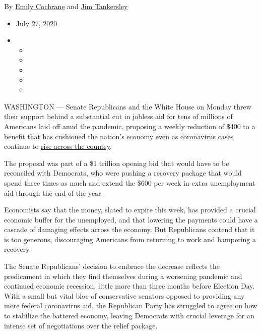 By \href{https://www.nytimes3xbfgragh.onion/by/emily-cochrane}{Emily
Cochrane} and
\href{https://www.nytimes3xbfgragh.onion/by/jim-tankersley}{Jim
Tankersley}

\begin{itemize}
\item
  July 27, 2020
\item
  \begin{itemize}
  \item
  \item
  \item
  \item
  \item
  \end{itemize}
\end{itemize}

WASHINGTON --- Senate Republicans and the White House on Monday threw
their support behind a substantial cut in jobless aid for tens of
millions of Americans laid off amid the pandemic, proposing a weekly
reduction of \$400 to a benefit that has cushioned the nation's economy
even as
\href{https://www.nytimes3xbfgragh.onion/2020/07/28/world/coronavirus-covid-19.html}{coronavirus}
cases continue to
\href{https://www.nytimes3xbfgragh.onion/interactive/2020/us/coronavirus-us-cases.html}{rise
across the country}.

The proposal was part of a \$1 trillion opening bid that would have to
be reconciled with Democrats, who were pushing a recovery package that
would spend three times as much and extend the \$600 per week in extra
unemployment aid through the end of the year.

Economists say that the money, slated to expire this week, has provided
a crucial economic buffer for the unemployed, and that lowering the
payments could have a cascade of damaging effects across the economy.
But Republicans contend that it is too generous, discouraging Americans
from returning to work and hampering a recovery.

The Senate Republicans' decision to embrace the decrease reflects the
predicament in which they find themselves during a worsening pandemic
and continued economic recession, little more than three months before
Election Day. With a small but vital bloc of conservative senators
opposed to providing any more federal coronavirus aid, the Republican
Party has struggled to agree on how to stabilize the battered economy,
leaving Democrats with crucial leverage for an intense set of
negotiations over the relief package.

